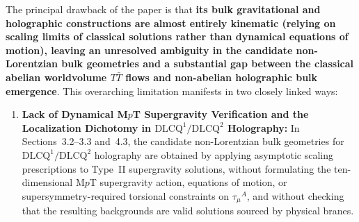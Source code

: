 \documentclass[11pt,a4paper]{article}
\begin{document}
The principal drawback of the paper is that \textbf{its bulk gravitational and holographic constructions are almost entirely kinematic (relying on scaling limits of classical solutions rather than dynamical equations of motion), leaving an unresolved ambiguity in the candidate non-Lorentzian bulk geometries and a substantial gap between the classical abelian worldvolume $T\bar{T}$ flows and non-abelian holographic bulk emergence}. This overarching limitation manifests in two closely linked ways:

\begin{enumerate}[label=(\alph*),leftmargin=1.8em]
    \item \textbf{Lack of Dynamical M$p$T Supergravity Verification and the Localization Dichotomy in $\text{DLCQ}^1/\text{DLCQ}^2$ Holography:}
    In Sections~3.2--3.3 and~4.3, the candidate non-Lorentzian bulk geometries for $\text{DLCQ}^1/\text{DLCQ}^2$ holography are obtained by applying asymptotic scaling prescriptions to Type~II supergravity solutions, without formulating the ten-dimensional M$p$T supergravity action, equations of motion, or supersymmetry-required torsional constraints on $\tau_{\mu}{}^A$, and without checking that the resulting backgrounds are valid solutions sourced by physical branes. 


\end{enumerate}
\end{document}
